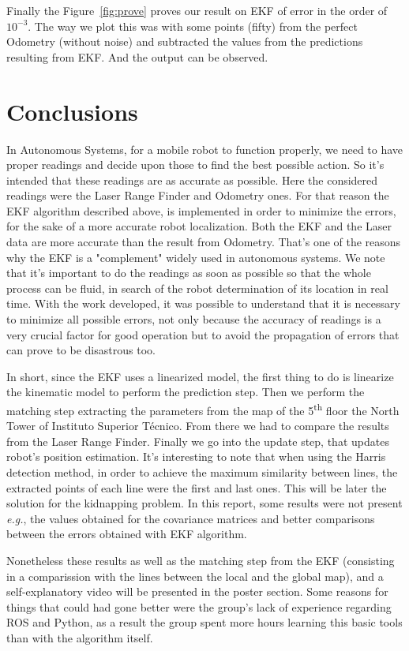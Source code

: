 \documentclass[a4paper]{IEEEtran}
\newcommand\nth{\textsuperscript{th}\xspace} %
\begin{document}
Finally the Figure~\ref{fig:prove} proves our result on EKF of error in the order of $10^{-3}$. The way we plot this was with some points (fifty) from the perfect Odometry (without noise) and subtracted the values from the predictions resulting from EKF. And the output can be observed.



\section{Conclusions}
\label{sec:conclusion}

In Autonomous Systems, for a mobile robot to function properly, we need to have proper readings and decide upon those to find the best possible action. So it's intended that these readings are as accurate as possible. Here the considered readings were the Laser Range Finder and Odometry ones.
For that reason the EKF algorithm described above, is implemented in order to minimize the errors, for the sake of a more accurate robot localization.
Both the EKF and the Laser data are more accurate than the result from Odometry. That's one of the reasons why the EKF is a "complement" widely used in autonomous systems.
We note that it's important to do the readings as soon as possible so that the whole process can be fluid, in search of the robot determination of its location in real time.
With the work developed, it was possible to understand that it is necessary to minimize all possible
errors, not only because the accuracy of readings is a very crucial factor for good operation but to avoid the propagation of errors that can prove to be disastrous too.\par
In short, since the EKF uses a linearized model, the first thing to do is linearize the kinematic model to perform the prediction step. Then we perform the matching step extracting the parameters from the map of the 5\nth floor the North Tower of Instituto Superior Técnico. From there we had to compare the results from the Laser Range Finder. Finally we go into the update step, that updates robot's position estimation.
It's interesting to note that when using the Harris detection method, in order to achieve the maximum similarity between lines, the extracted points of each line were the first and last ones. This will be later the solution for the kidnapping problem.
In this report, some results were not present \textit{e.g.}, the values obtained for the covariance matrices and better comparisons between the errors obtained with EKF algorithm.\par
Nonetheless these results as well as the matching step from the EKF (consisting in a comparission with the lines between the local and the global map), and a self-explanatory video will be presented in the poster section. Some reasons for things that could had gone better were the group's lack of experience regarding ROS and Python, as a result the group spent more hours learning this basic tools than with the algorithm itself.
\end{document}
